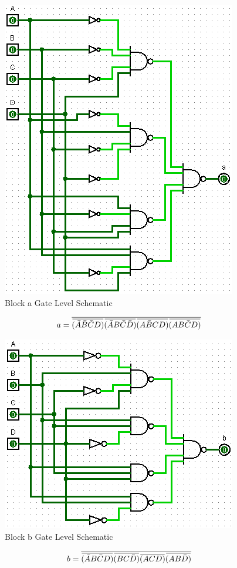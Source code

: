 \documentclass[12pt]{article}
\newcommand{\overbar}[1]{\mkern 1.5mu\overline{\mkern-1.5mu#1\mkern-1.5mu}\mkern 1.5mu} %
\begin{document}
\begin{figure}[h]
	\centering
	\label{fig:aBlockGates}
	\includegraphics[width=0.65\linewidth, keepaspectratio]{a_logicCkt}
	\caption{Block a Gate Level Schematic}
\end{figure}

\begin{equation}
	a = \overline{\overbar{(\bar{A}\bar{B}\bar{C}D)}\overbar{(\bar{A}B\bar{C}\bar{D})}\overbar{(A\bar{B}CD)}\overbar{(AB\bar{C}D)}}
\end{equation}

\begin{figure}[h]
	\centering
	\label{fig:bBlockGates}
	\includegraphics[width=0.65\linewidth, keepaspectratio]{b_logicCkt}
	\caption{Block b Gate Level Schematic}
\end{figure}

\begin{equation}
	b = \overline{\overbar{(\bar{A}B\bar{C}D)}\overbar{(BC\bar{D})}\overbar{(ACD)}\overbar{(AB\bar{D})}}
\end{equation}
\end{document}
